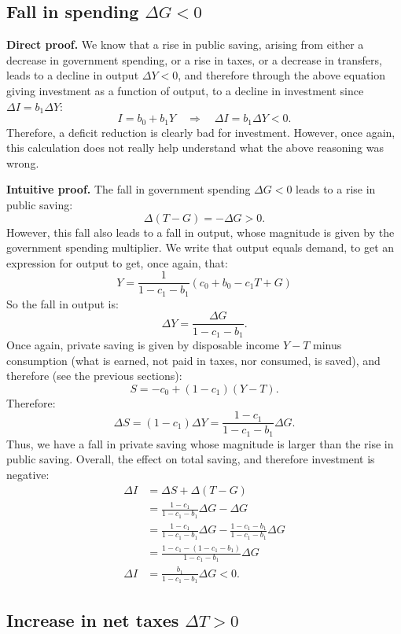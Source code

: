 \documentclass[]{book}
\begin{document}
\subsection{\texorpdfstring{Fall in spending
\(\Delta G<0\)}{Fall in spending \textbackslash{}Delta G\textless{}0}}\label{fall-in-spending-delta-g0-1}

\textbf{Direct proof.} We know that a rise in public saving, arising
from either a decrease in government spending, or a rise in taxes, or a
decrease in transfers, leads to a decline in output \(\Delta Y<0\), and
therefore through the above equation giving investment as a function of
output, to a decline in investment since \(\Delta I=b_{1}\Delta Y\):
\[I=b_{0}+b_{1}Y\quad\Rightarrow\quad\Delta I=b_{1}\Delta Y<0.\]
Therefore, a deficit reduction is clearly bad for investment. However,
once again, this calculation does not really help understand what the
above reasoning was wrong.

\textbf{Intuitive proof.} The fall in government spending \(\Delta G<0\)
leads to a rise in public saving: \[\Delta(T-G)=-\Delta G>0.\] However,
this fall also leads to a fall in output, whose magnitude is given by
the government spending multiplier. We write that output equals demand,
to get an expression for output to get, once again, that:
\[Y=\frac{1}{1-c_{1}-b_{1}}\left(c_{0}+b_{0}-c_{1}T+G\right)\] So the
fall in output is: \[\Delta Y=\frac{\Delta G}{1-c_{1}-b_{1}}.\] Once
again, private saving is given by disposable income \(Y-T\) minus
consumption (what is earned, not paid in taxes, nor consumed, is saved),
and therefore (see the previous sections):
\[S=-c_{0}+\left(1-c_{1}\right)\left(Y-T\right).\] Therefore:
\[\Delta S=(1-c_{1})\Delta Y=\frac{1-c_{1}}{1-c_{1}-b_{1}}\Delta G.\]
Thus, we have a fall in private saving whose magnitude is larger than
the rise in public saving. Overall, the effect on total saving, and
therefore investment is negative: \[
\begin{aligned}
\Delta I    &=\Delta S+\Delta(T-G)\\
&=\frac{1-c_{1}}{1-c_{1}-b_{1}}\Delta G-\Delta G\\
&=\frac{1-c_{1}}{1-c_{1}-b_{1}}\Delta G-\frac{1-c_{1}-b_{1}}{1-c_{1}-b_{1}}\Delta G\\
&=\frac{1-c_{1}-(1-c_{1}-b_{1})}{1-c_{1}-b_{1}}\Delta G\\
\Delta I &=\frac{b_{1}}{1-c_{1}-b_{1}}\Delta G<0.
\end{aligned}
\]

\subsection{\texorpdfstring{Increase in net taxes
\(\Delta T>0\)}{Increase in net taxes \textbackslash{}Delta T\textgreater{}0}}\label{increase-in-net-taxes-delta-t0-1}
\end{document}

